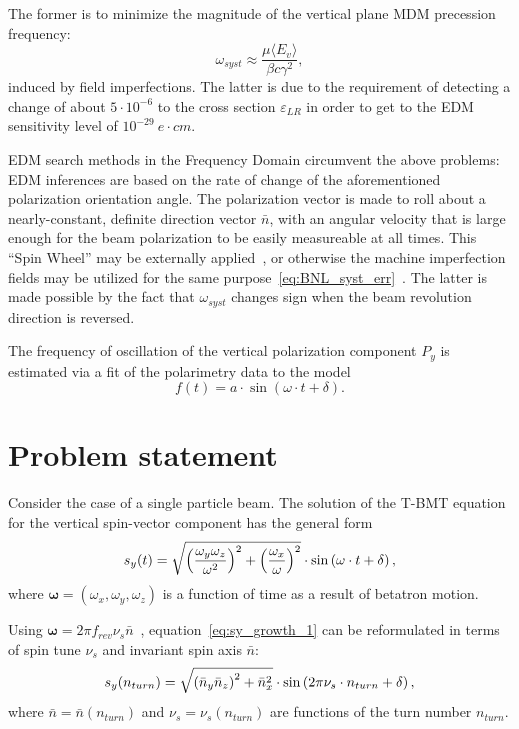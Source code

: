 \documentclass[a4paper]{jacow}
\renewcommand{\vec}{\boldsymbol}
\newcommand{\w}{\omega}
\newcommand{\avg}[1]{\langle {#1} \rangle}
\newcommand{\nbar}{\bar n}
\begin{document}
The former is to minimize the magnitude of
the vertical plane MDM precession frequency:~\cite[p.~11]{BNL:Deuteron2008}
\begin{equation}\label{eq:BNL_syst_err}
\w_{syst} \approx \frac{\mu\avg{E_v}}{\beta c\gamma^2},
\end{equation}
induced by field imperfections. The latter is due to the requirement of detecting a change of about
$5\cdot 10^{-6}$ to the cross section $\varepsilon_{LR}$ in order to get to the EDM sensitivity level
of $10^{-29}~e\cdot cm$.~\cite[p.~18]{BNL:Deuteron2008}

EDM search methods in the Frequency Domain circumvent the above problems: EDM inferences are based
on the rate of change of the aforementioned polarization orientation angle. The polarization vector is made to
roll about a nearly-constant, definite direction vector $\nbar$, with an angular velocity
that is large enough for the beam polarization to be easily measureable at all times. This ``Spin Wheel'' may be
externally applied~\cite{Koop:SW}, or otherwise the machine imperfection fields
may be utilized for the same purpose~\eqref{eq:BNL_syst_err}~\cite{Senichev:FDM}. The latter is made possible
by the fact that $\w_{syst}$ changes sign when the beam revolution direction
is reversed.~\cite[p.~11]{BNL:Deuteron2008}

The frequency of oscillation of the vertical polarization component $P_y$ is estimated
via a fit of the polarimetry data to the model
\begin{equation}\label{eq:fit_model}
  f(t) = a\cdot\sin(\w\cdot t + \delta).
\end{equation}

\section{Problem statement}
\newcommand{\ntrn}{n_{turn}}
Consider the case of a single particle beam. The solution of the T-BMT equation for the
vertical spin-vector component has the general form
\begin{equation}\label{eq:sy_growth_1}
  s_y(t) = \sqrt{\bkt{\frac{\w_y\w_z}{\w^2}}^2 + \bkt{\frac{\w_x}{\w}}^2}\cdot\sin\bkt{\w\cdot t + \delta},
\end{equation}
where $\vec\w = (\w_x, \w_y, \w_z)$ is a function of time as a result of betatron motion.

Using $\vec\w = 2\pi f_{rev}\nu_s\nbar$~\cite[p.~4]{COSY:SpinTuneMapping}, equation~\eqref{eq:sy_growth_1}
can be reformulated in terms of spin tune $\nu_s$ and invariant spin axis $\bar n$:
\begin{equation}\label{eq:main}
  s_y(n_{turn}) = \sqrt{\bkt{\nbar_y\nbar_z}^2 + \nbar_x^2}\cdot\sin\bkt{2\pi\nu_s\cdot\ntrn + \delta},
\end{equation}
where $\nbar = \nbar(\ntrn)$ and $\nu_s = \nu_s(\ntrn)$ are functions of the turn number $\ntrn$.
\end{document}
